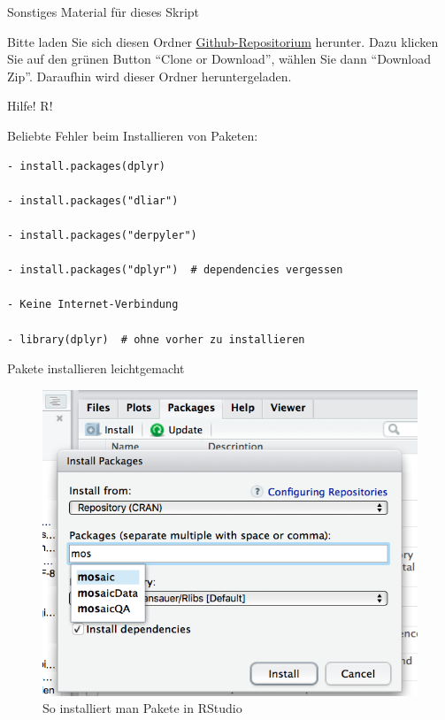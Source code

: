 \begin{frame}{Sonstiges Material für dieses Skript}

Bitte laden Sie sich diesen Ordner
\href{https://github.com/sebastiansauer/Praxis_der_Datenanalyse/tree/gh-pages}{Github-Repositorium}
herunter. Dazu klicken Sie auf den grünen Button ``Clone or Download'',
wählen Sie dann ``Download Zip''. Daraufhin wird dieser Ordner
heruntergeladen.

\end{frame}

\begin{frame}[fragile]{Hilfe! R!}

Beliebte Fehler beim Installieren von Paketen:

\begin{verbatim}
- install.packages(dplyr) 

- install.packages("dliar")

- install.packages("derpyler") 

- install.packages("dplyr")  # dependencies vergessen 

- Keine Internet-Verbindung 

- library(dplyr)  # ohne vorher zu installieren
\end{verbatim}

\end{frame}

\begin{frame}{Pakete installieren leichtgemacht}

\begin{figure}

{\centering \includegraphics[width=0.5\linewidth]{../images/Rahmen/install_packages} 

}

\caption{So installiert man Pakete in RStudio}\label{fig:fig-install-packages}
\end{figure}

\end{frame}


